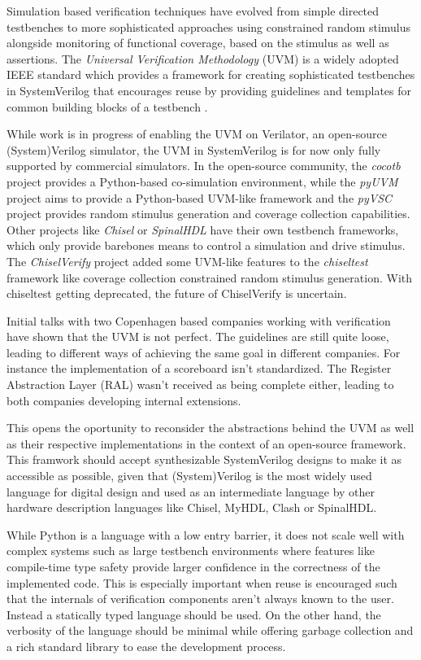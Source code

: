 \documentclass[11pt]{article}
\begin{document}
Simulation based verification techniques have evolved from simple directed testbenches to more sophisticated approaches using constrained random stimulus alongside monitoring of functional coverage, based on the stimulus as well as assertions. 
The \textit{Universal Verification Methodology} (UVM) is a widely adopted IEEE standard which provides a framework for creating sophisticated testbenches in SystemVerilog that encourages reuse by providing guidelines and templates for common building blocks of a testbench \cite{flake2020a}. 

While work is in progress of enabling the UVM on Verilator, an open-source (System)Verilog simulator, the UVM in SystemVerilog is for now only fully supported by commercial simulators.
In the open-source community, the \textit{cocotb} project provides a Python-based co-simulation environment, while the \textit{pyUVM} project aims to provide a Python-based UVM-like framework and the \textit{pyVSC} project provides random stimulus generation and coverage collection capabilities. Other projects like \textit{Chisel} or \textit{SpinalHDL} have their own testbench frameworks, which only provide barebones means to control a simulation and drive stimulus. The \textit{ChiselVerify} project added some UVM-like features to the \textit{chiseltest} framework like coverage collection constrained random stimulus generation. With chiseltest getting deprecated, the future of ChiselVerify is uncertain.

Initial talks with two Copenhagen based companies working with verification have shown that the UVM is not perfect. The guidelines are still quite loose, leading to different ways of achieving the same goal in different companies. For instance the implementation of a scoreboard isn't standardized. The Register Abstraction Layer (RAL) wasn't received as being complete either, leading to both companies developing internal extensions.

This opens the oportunity to reconsider the abstractions behind the UVM as well as their respective implementations in the context of an open-source framework. This framwork should accept synthesizable SystemVerilog designs to make it as accessible as possible, given that (System)Verilog is the most widely used language for digital design and used as an intermediate language by other hardware description languages like Chisel, MyHDL, Clash or SpinalHDL.

While Python is a language with a low entry barrier, it does not scale well with complex systems such as large testbench environments where features like compile-time type safety provide larger confidence in the correctness of the implemented code. This is especially important when reuse is encouraged such that the internals of verification components aren't always known to the user. Instead a statically typed language should be used. On the other hand, the verbosity of the language should be minimal while offering garbage collection and a rich standard library to ease the development process. 
\end{document}
